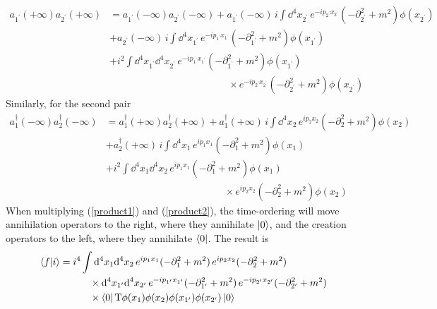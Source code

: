 \begin{equation}
\begin{aligned}
a_{1^\prime}(+\infty)a_{2^\prime}(+\infty)&=a_{1^\prime}(-\infty)a_{2^\prime}(-\infty)+a_{1^\prime}(-\infty)\,i\int\dd^4x_{2^\prime}\,e^{-ip_{2^\prime}x_{2^\prime}}(-\partial^2_{2^\prime}+m^2)\phi(x_{2^\prime})\\
&+a_{2^\prime}(-\infty)\,i\int\dd^4x_{1^\prime}\,e^{-ip_{1^\prime}x_{1^\prime}}(-\partial^2_{1^\prime}+m^2)\phi(x_{1^\prime})\\
&+i^2\int\dd^4x_{1^\prime}\dd^4x_{2^\prime}\,e^{-ip_{1^\prime}x_{1^\prime}}(-\partial^2_{1^\prime}+m^2)\phi(x_{1^\prime})\\
&\qquad\qquad\qquad\qquad\qquad\qquad\times e^{-ip_{2^\prime}x_{2^\prime}}(-\partial^2_{2^\prime}+m^2)\phi(x_{2^\prime})
\end{aligned}
\label{product1}
\end{equation}
Similarly, for the second pair 
\begin{equation}
\begin{aligned}
a^\dagger_{1}(-\infty)a^\dagger_{2}(-\infty)&=a^\dagger_{1}(+\infty)a^\dagger_{2}(+\infty)+a^\dagger_{1}(+\infty)\,i\int\dd^4x_{2}\,e^{ip_{2}x_{2}}(-\partial^2_{2}+m^2)\phi(x_{2})\\
&+a^\dagger_{2}(+\infty)\,i\int\dd^4x_{1}\,e^{ip_{1}x_{1}}(-\partial^2_{1}+m^2)\phi(x_{1})\\
&+i^2\int\dd^4x_{1}\dd^4x_{2}\,e^{ip_{1}x_{1}}(-\partial^2_{1}+m^2)\phi(x_{1})\\
&\qquad\qquad\qquad\qquad\qquad\qquad\times e^{ip_{2}x_{2}}(-\partial^2_{2}+m^2)\phi(x_{2})
\end{aligned}
\label{product2}
\end{equation}
When multiplying (\ref{product1}) and (\ref{product2}), the time-ordering will move annihilation operators to the right, where they annihilate $\ket{0}$, and the creation operators to the left, where they annihilate $\bra{0}$. The result is
\begin{equation}
\begin{aligned}
    \braket{f}{i}&=i^4\int\dd^4x_1\dd^4x_2\,e^{ip_1x_1}(-\partial_1^2+m^2)\,e^{ip_2x_2}(-\partial_2^2+m^2)\\
    &\qquad\quad\times\dd^4x_{1^\prime}\dd^4x_{2^\prime}\,e^{-ip_{1^\prime}x_{1^\prime}}(-\partial_{1^\prime}^2+m^2)\,e^{-ip_{2^\prime}x_{2^\prime}}(-\partial_{2^\prime}^2+m^2)\\&\qquad\quad\times\bra{0}\text{T}\phi(x_1)\phi(x_2)\phi(x_{1^\prime})\phi(x_{2^\prime})\ket{0}
    \label{2lsz}
\end{aligned}
\end{equation}
